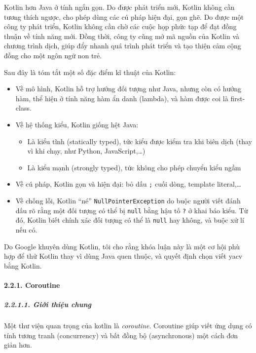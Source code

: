 \documentclass[
]{article}
\begin{document}
Kotlin hơn Java ở tính ngắn gọn. Do được phát triển mới, Kotlin không
cần tương thích ngược, cho phép dùng các cú pháp hiện đại, gọn ghẽ. Do
được một công ty phát triển, Kotlin không cần chờ các cuộc họp phức tạp
để đạt đồng thuận về tính năng mới. Đồng thời, công ty cũng mở mã nguồn
của Kotlin và chương trình dịch, giúp đẩy nhanh quá trình phát triển và
tạo thiện cảm cộng đồng cho một ngôn ngữ non trẻ.

Sau đây là tóm tắt một số đặc điểm kĩ thuật của Kotlin:

\begin{itemize}
\item
  Về mô hình, Kotlin hỗ trợ hướng đối tượng như Java, nhưng còn có hướng
  hàm, thể hiện ở tính năng hàm ẩn danh (lambda), và hàm được coi là
  first-class.
\item
  Về hệ thống kiểu, Kotlin giống hệt Java:

  \begin{itemize}
    \item
    Là kiểu tĩnh (statically typed), tức kiểu được kiểm tra khi biên
    dịch (thay vì khi chạy, như Python, JavaScript,\ldots)
  \item
    Là kiểu mạnh (strongly typed), tức không cho phép chuyển kiểu ngầm
  \end{itemize}
\item
  Về cú pháp, Kotlin gọn và hiện đại: bỏ dấu \texttt{;} cuối dòng,
  template literal,\ldots{}
\item
  Về chống lỗi, Kotlin ``né'' \texttt{NullPointerException} do buộc
  người viết đánh dấu rõ rằng một đối tượng có thể bị \texttt{null} bằng
  hậu tố \texttt{?} ở khai báo kiểu. Từ đó, Kotlin biết chính xác đối
  tượng có thể là \texttt{null} hay không, và buộc xử lí nếu có.
\end{itemize}

Do Google khuyên dùng Kotlin, tôi cho rằng khóa luận này là một cơ hội
phù hợp để thử Kotlin thay vì dùng Java quen thuộc, và quyết định chọn
viết yacv bằng Kotlin.

\hypertarget{coroutine}{%
\paragraph{\texorpdfstring{2.2.1. Coroutine
}{2.2.1. Coroutine }}\label{coroutine}}

\hypertarget{giux1edbi-thiux1ec7u-chung}{%
\subparagraph{2.2.1.1. Giới thiệu
chung}\label{giux1edbi-thiux1ec7u-chung}}

Một thư viện quan trọng của kotlin là \emph{coroutine}. Coroutine giúp
viết ứng dụng có tính tương tranh (concurrency) và bất đồng bộ
(asynchronous) một cách đơn giản hơn.
\end{document}

